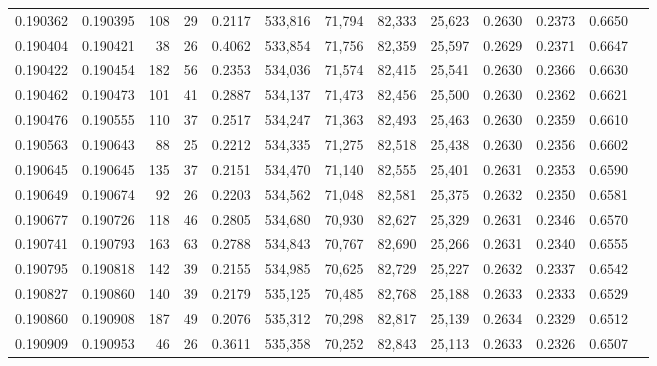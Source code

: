 \begin{tabular}{rrrrrrrrrrrrr}
0.190362 & 0.190395 &   108 &  29 &                                     0.2117 & 533,816 &  71,794 &  82,333 &  25,623 & 0.2630 & 0.2373 & 0.6650 \\
0.190404 & 0.190421 &    38 &  26 &                                     0.4062 & 533,854 &  71,756 &  82,359 &  25,597 & 0.2629 & 0.2371 & 0.6647 \\
0.190422 & 0.190454 &   182 &  56 &                                     0.2353 & 534,036 &  71,574 &  82,415 &  25,541 & 0.2630 & 0.2366 & 0.6630 \\
0.190462 & 0.190473 &   101 &  41 &                                     0.2887 & 534,137 &  71,473 &  82,456 &  25,500 & 0.2630 & 0.2362 & 0.6621 \\
0.190476 & 0.190555 &   110 &  37 &                                     0.2517 & 534,247 &  71,363 &  82,493 &  25,463 & 0.2630 & 0.2359 & 0.6610 \\
0.190563 & 0.190643 &    88 &  25 &                                     0.2212 & 534,335 &  71,275 &  82,518 &  25,438 & 0.2630 & 0.2356 & 0.6602 \\
0.190645 & 0.190645 &   135 &  37 &                                     0.2151 & 534,470 &  71,140 &  82,555 &  25,401 & 0.2631 & 0.2353 & 0.6590 \\
0.190649 & 0.190674 &    92 &  26 &                                     0.2203 & 534,562 &  71,048 &  82,581 &  25,375 & 0.2632 & 0.2350 & 0.6581 \\
0.190677 & 0.190726 &   118 &  46 &                                     0.2805 & 534,680 &  70,930 &  82,627 &  25,329 & 0.2631 & 0.2346 & 0.6570 \\
0.190741 & 0.190793 &   163 &  63 &                                     0.2788 & 534,843 &  70,767 &  82,690 &  25,266 & 0.2631 & 0.2340 & 0.6555 \\
0.190795 & 0.190818 &   142 &  39 &                                     0.2155 & 534,985 &  70,625 &  82,729 &  25,227 & 0.2632 & 0.2337 & 0.6542 \\
0.190827 & 0.190860 &   140 &  39 &                                     0.2179 & 535,125 &  70,485 &  82,768 &  25,188 & 0.2633 & 0.2333 & 0.6529 \\
0.190860 & 0.190908 &   187 &  49 &                                     0.2076 & 535,312 &  70,298 &  82,817 &  25,139 & 0.2634 & 0.2329 & 0.6512 \\
0.190909 & 0.190953 &    46 &  26 &                                     0.3611 & 535,358 &  70,252 &  82,843 &  25,113 & 0.2633 & 0.2326 & 0.6507 \\

\end{tabular}
